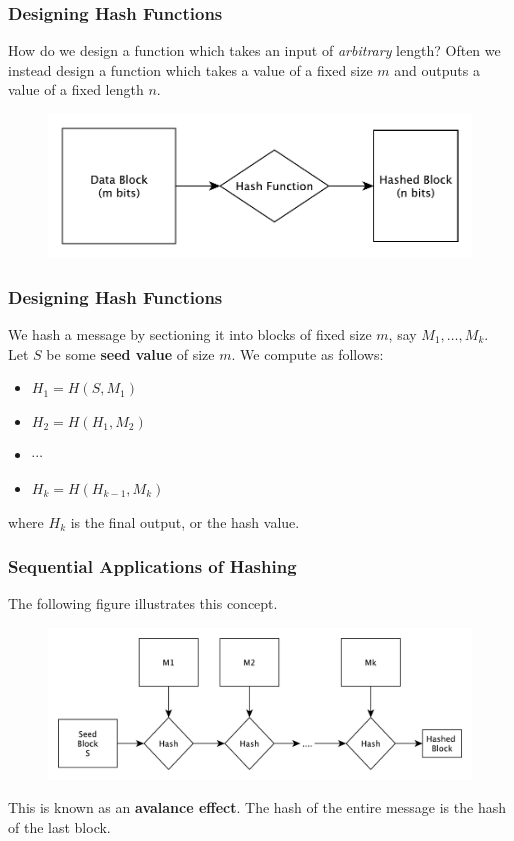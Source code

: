 \documentclass{beamer}
\newcommand{\<}{\langle}
\renewcommand{\>}{\rangle}
\begin{document}
\begin{frame}
\frametitle{Designing Hash Functions}

How do we design a function which takes an input of \emph{arbitrary} length? Often we instead design a function which takes a value of a fixed size $m$ and outputs a value of a fixed length $n$. 
\begin{figure}
\includegraphics[scale=.6]{IMG/hash2}
\end{figure}
\end{frame}


\begin{frame}
\frametitle{Designing Hash Functions}

We hash a message by sectioning it into blocks of fixed size $m$, say $M_1,\dots, M_k$. Let $S$ be some \textbf{seed value} of size $m$. We compute as follows:
\begin{itemize}
\item $H_1 = H(S, M_1)$
\item $H_2 = H(H_1, M_2)$
\item $\cdots$
\item $H_k = H(H_{k-1}, M_k)$
\end{itemize}
where $H_k$ is the final output, or the hash value. 
\end{frame}

\begin{frame}
\frametitle{Sequential Applications of Hashing}

The following figure illustrates this concept. 
\begin{figure}
\includegraphics[scale=.5]{IMG/hash3}
\end{figure}

This is known as an \textbf{avalance effect}. The hash of the entire message is the hash of the last block.
\end{frame}
\end{document}
